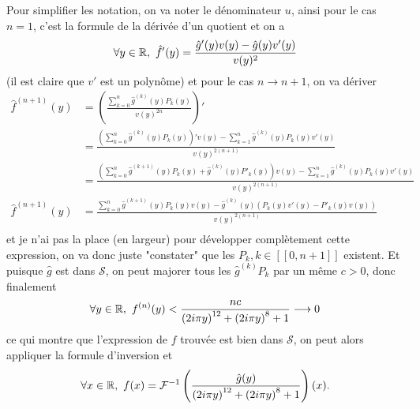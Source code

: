 \documentclass[a4paper,12pt,reqno]{amsart}
\newcommand{\Par}[1]{\left(#1\right)}
\begin{document}
Pour simplifier les notation, on va noter le dénominateur $u$, ainsi pour le cas $n=1$, c'est la formule de la dérivée d'un quotient et on a 
$$\forall y\in\mathbb{R},\ \hat f'(y)=\frac{\hat g'(y)v(y)-\hat g(y)v'(y)}{v(y)^2}$$
(il est claire que $v'$ est un polynôme) et pour le cas $n\to n+1$, on va dériver
\begin{align*}
	\hat f^{(n+1)}(y)&=\Par{\frac{\sum_{k=0}^n \hat g^{(k)}(y)P_k(y)}{v(y)^{2n}}}'\\
	&=\frac{\Par{\sum_{k=0}^n \hat g^{(k)}(y)P_k(y)}'v(y)-\sum_{k=1}^n \hat g^{(k)}(y)P_k(y)v'(y)}{v(y)^{2(n+1)}}\\
	&=\frac{\Par{\sum_{k=0}^n \hat g^{(k+1)}(y)P_k(y)+\hat g^{(k)}(y)P'_k(y)}v(y)-\sum_{k=1}^n \hat g^{(k)}(y)P_k(y)v'(y)}{v(y)^{2(n+1)}}\\
	\hat f^{(n+1)}(y)&=\frac{\sum_{k=0}^n \hat g^{(k+1)}(y)P_k(y)v(y)-\hat g^{(k)}(y)\Par{P_k(y)v'(y)-P'_k(y)v(y)}}{v(y)^{2(n+1)}}\\
\end{align*}
et je n'ai pas la place (en largeur) pour développer complètement cette expression, on va donc juste "constater" que les $P_k, k\in[\![0,n+1]\!]$ existent.
Et puisque $\hat g$ est dans $\mathcal S$, on peut majorer tous les $\hat g^{(k)}P_k$ par un même $c>0$, donc finalement 
$$\forall y\in\R,\ f^{(n)}(y)<\frac{nc}{{\Par{2i\pi y}^{12}+\Par{2i\pi y}^{8}+1}}\longrightarrow 0$$
ce qui montre que l'expression de $f$ trouvée est bien dans $\mathcal S$, on peut alors appliquer la formule d'inversion et 
$$\forall x\in\R,\ f(x)=\mathcal F^{-1}\Par{\frac{\hat g(y)}{\Par{2i\pi y}^{12}+\Par{2i\pi y}^{8}+1}}(x).$$
\end{document}
